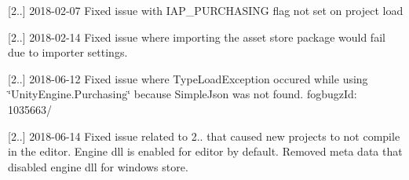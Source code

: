 \mbox{[}2..\mbox{]} 2018-\/02-\/07 Fixed issue with I\+A\+P\+\_\+\+P\+U\+R\+C\+H\+A\+S\+I\+NG flag not set on project load

\mbox{[}2..\mbox{]} 2018-\/02-\/14 Fixed issue where importing the asset store package would fail due to importer settings.

\mbox{[}2..\mbox{]} 2018-\/06-\/12 Fixed issue where Type\+Load\+Exception occured while using \char`\"{}\+Unity\+Engine.\+Purchasing\char`\"{} because Simple\+Json was not found. fogbugz\+Id\+: 1035663/

\mbox{[}2..\mbox{]} 2018-\/06-\/14 Fixed issue related to 2.. that caused new projects to not compile in the editor. Engine dll is enabled for editor by default. Removed meta data that disabled engine dll for windows store. 